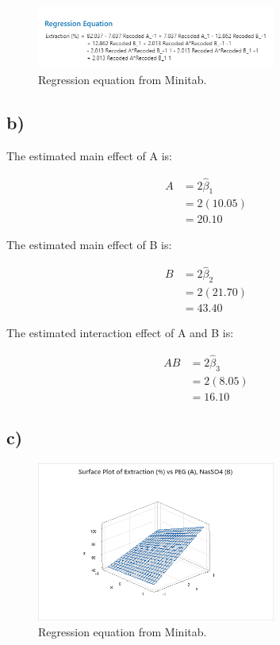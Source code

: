 \documentclass{article}
\begin{document}
\begin{figure}[h]
    \centering
    \includegraphics[width=0.7\textwidth]{./images/6_a_2.png}
    \caption{Regression equation from Minitab.}
    \label{fig:3_b_2}
\end{figure}

\subsection*{b)}
\begin{flushleft}
The estimated main effect of A is:
\end{flushleft}
\begin{align*}
    A &= 2 \hat{\beta}_1\\
      &= 2(10.05)\\
      &= 20.10
\end{align*}
\begin{flushleft}
The estimated main effect of B is:
\end{flushleft}
\begin{align*}
    B &= 2 \hat{\beta}_2\\
      &= 2(21.70)\\
      &= 43.40
\end{align*}
\begin{flushleft}
The estimated interaction effect of A and B is:
\end{flushleft}
\begin{align*}
    AB &= 2 \hat{\beta}_3\\
       &= 2(8.05)\\
       &= 16.10
\end{align*}


\clearpage
\subsection*{c)}

\begin{figure}[h]
    \centering
    \includegraphics[width=0.7\textwidth]{./images/6_c.png}
    \caption{Regression equation from Minitab.}
    \label{fig:3_b_2}
\end{figure}
\end{document}
